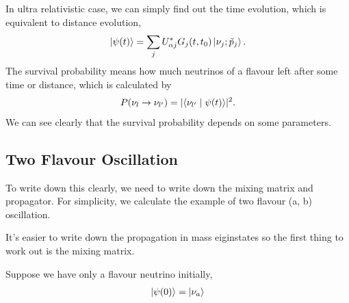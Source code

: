 \documentclass[letterpaper,12pt,english]{sphinxmanual}
\newcommand{\ket}[1]{\left| #1\right\rangle}
\newcommand{\braket}[2]{\langle #1 \mid #2 \rangle}
\begin{document}
In ultra relativistic case, we can simply find out the time evolution, which is equivalent to distance evolution,
\begin{gather}
\begin{split}\ket{\psi(t)} = \sum_j U^*_{\alpha j} G_j(t,t_0) \ket{\nu_j;\tilde p_j}.\end{split}\notag
\end{gather}
The survival probability means how much neutrinos of a flavour left after some time or distance, which is calculated by
\begin{gather}
\begin{split}P(\nu_l\to\nu_{l'}) = \lvert \braket{\nu_{l'} }{\psi (t)}  \rvert^2 .\end{split}\notag
\end{gather}
We can see clearly that the survival probability depends on some parameters.


\subsection{Two Flavour Oscillation}
\label{oscillations:two-flavour-oscillation}
To write down this clearly, we need to write down the mixing matrix and propagator. For simplicity, we calculate the example of two flavour (a, b) oscillation.

It's easier to write down the propagation in mass eiginstates so the first thing to work out is the mixing matrix.

Suppose we have only a flavour neutrino initially,
\begin{gather}
\begin{split}\ket{\psi(0)} = \ket{\nu_a}\end{split}\notag
\end{gather}
\end{document}
